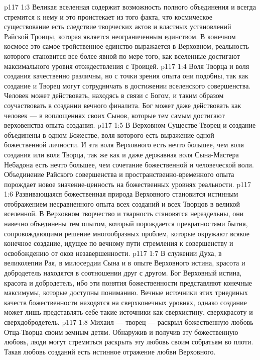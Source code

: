 \vs p117 1:3 Великая вселенная содержит возможность полного объединения и всегда стремится к нему и это проистекает из того факта, что космическое существование есть следствие творческих актов и властных установлений Райской Троицы, которая является неограниченным единством. В конечном космосе это самое тройственное единство выражается в Верховном, реальность которого становится все более явной по мере того, как вселенные достигают максимального уровня отождествления с Троицей.
\vs p117 1:4 \pc Воля Творца и воля создания качественно различны, но с точки зрения опыта они подобны, так как создание и Творец могут сотрудничать в достижении вселенского совершенства. Человек может действовать, находясь в связи с Богом, и таким образом соучаствовать в создании вечного финалита. Бог может даже действовать как человек --- в воплощениях своих Сынов, которые тем самым достигают верховенства опыта создания.
\vs p117 1:5 В Верховном Существе Творец и создание объединены в одном Божестве, воля которого есть выражение одной божественной личности. И эта воля Верховного есть нечто большее, чем воля создания или воля Творца, так же как и даже державная воля Сына\hyp{}Мастера Небадона есть нечто большее, чем сочетание божественной и человеческой воли. Объединение Райского совершенства и пространственно\hyp{}временного опыта порождает новое значение\hyp{}ценность на божественных уровнях реальности.
\vs p117 1:6 Развивающаяся божественная природа Верховного становится истинным отображением несравненного опыта всех созданий и всех Творцов в великой вселенной. В Верховном творчество и тварность становятся нераздельны, они навечно объединены тем опытом, который порождается превратностями бытия, сопровождающими решение многообразных проблем, которые окружают всякое конечное создание, идущее по вечному пути стремления к совершенству и освобождению от оков незавершенности.
\vs p117 1:7 \pc В служении Духа, в великолепии Рая, в милосердии Сына и в опыте Верховного истина, красота и добродетель находятся в соотношении друг с другом. Бог Верховный  истина, красота и добродетель, ибо эти понятия божественности представляют конечные максимумы, которые доступны пониманию. Вечные источники этих триединых качеств божественности находятся на сверхконечных уровнях, однако создание может лишь представлять себе такие источники как сверхистину, сверхкрасоту и сверхдобродетель.
\vs p117 1:8 Михаил --- творец --- раскрыл божественную любовь Отца\hyp{}Творца своим земным детям. Обнаружив и получив эту божественную любовь, люди могут стремиться раскрыть эту любовь своим собратьям во плоти. Такая любовь созданий есть истинное отражение любви Верховного.

